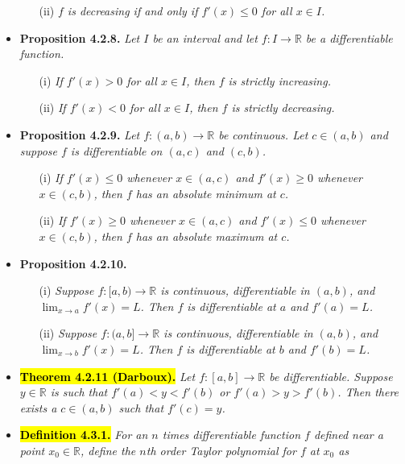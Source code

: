 \documentclass[a4paper,10pt]{article}
\begin{document}
\begin{multicols}{2}
\begin{itemize}
\begin{itemize}
      \item[(ii)] \textit{\( f \) is decreasing if and only if \( f'(x) \leq 0 \) for all \( x \in I \).}
    \end{itemize}
    \item \textbf{Proposition 4.2.8.} \textit{Let \( I \) be an interval and let \( f : I \to \mathbb{R} \) be a differentiable function.}
    \begin{itemize}
      \item[(i)] \textit{If \( f'(x) > 0 \) for all \( x \in I \), then \( f \) is strictly increasing.}
      \item[(ii)] \textit{If \( f'(x) < 0 \) for all \( x \in I \), then \( f \) is strictly decreasing.}
    \end{itemize}
    \item \textbf{Proposition 4.2.9.} \textit{Let \( f : (a, b) \to \mathbb{R} \) be continuous. Let \( c \in (a, b) \) and suppose \( f \) is differentiable on \( (a, c) \) and \( (c, b) \).}
    \begin{itemize}
      \item[(i)] \textit{If \( f'(x) \leq 0 \) whenever \( x \in (a, c) \) and \( f'(x) \geq 0 \) whenever \( x \in (c, b) \), then \( f \) has an absolute minimum at \( c \).}
      \item[(ii)] \textit{If \( f'(x) \geq 0 \) whenever \( x \in (a, c) \) and \( f'(x) \leq 0 \) whenever \( x \in (c, b) \), then \( f \) has an absolute maximum at \( c \).}
    \end{itemize}
    \item \textbf{Proposition 4.2.10.}
    \begin{itemize}
      \item[(i)] \textit{Suppose \( f : [a, b) \to \mathbb{R} \) is continuous, differentiable in \( (a, b) \), and \( \lim_{x \to a} f'(x) = L \). Then \( f \) is differentiable at \( a \) and \( f'(a) = L \).}
      \item[(ii)] \textit{Suppose \( f : (a, b] \to \mathbb{R} \) is continuous, differentiable in \( (a, b) \), and \( \lim_{x \to b} f'(x) = L \). Then \( f \) is differentiable at \( b \) and \( f'(b) = L \).}
    \end{itemize}
    \item \hl{\textbf{Theorem 4.2.11 (Darboux).}} \textit{Let \( f : [a, b] \to \mathbb{R} \) be differentiable. Suppose \( y \in \mathbb{R} \) is such that \( f'(a) < y < f'(b) \) or \( f'(a) > y > f'(b) \). Then there exists a \( c \in (a, b) \) such that \( f'(c) = y \).}
    \item \hl{\textbf{Definition 4.3.1.}} \textit{For an \( n \) times differentiable function \( f \) defined near a point \( x_0 \in \mathbb{R} \), define the \( n \)th order \textit{Taylor polynomial} for \( f \) at \( x_0 \) as}

\end{itemize}
\end{multicols}
\end{document}
